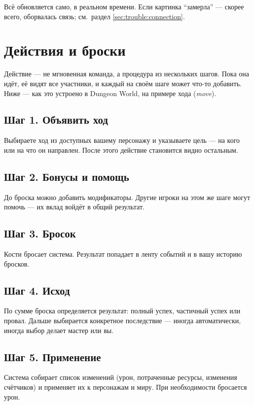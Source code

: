 
Всё обновляется само, в реальном времени. Если картинка ``замерла'' --- скорее всего, оборвалась связь; см.\ раздел \ref{sec:trouble:connection}.

\section{Действия и броски}
\label{sec:player:actions}

Действие --- не мгновенная команда, а процедура из нескольких шагов. Пока она идёт, её видят все участники, и каждый на своём шаге может что-то добавить. Ниже --- как это устроено в Dungeon World, на примере хода (\emph{move}).

\subsection{Шаг 1. Объявить ход}
Выбираете ход из доступных вашему персонажу и указываете цель --- на кого или на что он направлен. После этого действие становится видно остальным.

\subsection{Шаг 2. Бонусы и помощь}
До броска можно добавить модификаторы. Другие игроки на этом же шаге могут помочь --- их вклад войдёт в общий результат.

\subsection{Шаг 3. Бросок}
Кости бросает система. Результат попадает в ленту событий и в вашу историю бросков.

\subsection{Шаг 4. Исход}
По сумме броска определяется результат: полный успех, частичный успех или провал. Дальше выбирается конкретное последствие --- иногда автоматически, иногда выбор делает мастер или вы.

\subsection{Шаг 5. Применение}
Система собирает список изменений (урон, потраченные ресурсы, изменения счётчиков) и применяет их к персонажам и миру. При необходимости бросается урон.

